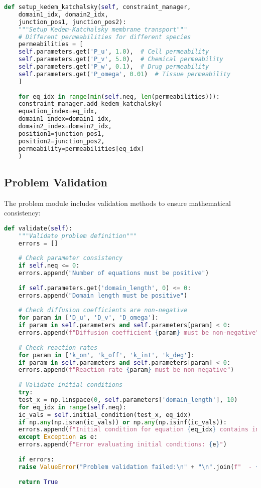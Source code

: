 \begin{lstlisting}[language=Python, caption=Kedem-Katchalsky Conditions]
	def setup_kedem_katchalsky(self, constraint_manager,
	domain1_idx, domain2_idx, 
	junction_pos1, junction_pos2):
	"""Setup Kedem-Katchalsky membrane transport"""
	# Different permeabilities for different species
	permeabilities = [
	self.parameters.get('P_u', 1.0),  # Cell permeability
	self.parameters.get('P_v', 5.0),  # Chemical permeability
	self.parameters.get('P_w', 0.1),  # Drug permeability
	self.parameters.get('P_omega', 0.01)  # Tissue permeability
	]
	
	for eq_idx in range(min(self.neq, len(permeabilities))):
	constraint_manager.add_kedem_katchalsky(
	equation_index=eq_idx,
	domain1_index=domain1_idx,
	domain2_index=domain2_idx,
	position1=junction_pos1,
	position2=junction_pos2,
	permeability=permeabilities[eq_idx]
	)
\end{lstlisting}

\subsection{Problem Validation}
\label{subsec:problem_validation}

The problem module includes validation methods to ensure mathematical consistency:

\begin{lstlisting}[language=Python, caption=Problem Validation]
	def validate(self):
	"""Validate problem definition"""
	errors = []
	
	# Check parameter consistency
	if self.neq <= 0:
	errors.append("Number of equations must be positive")
	
	if self.parameters.get('domain_length', 0) <= 0:
	errors.append("Domain length must be positive")
	
	# Check diffusion coefficients are non-negative
	for param in ['D_u', 'D_v', 'D_omega']:
	if param in self.parameters and self.parameters[param] < 0:
	errors.append(f"Diffusion coefficient {param} must be non-negative")
	
	# Check reaction rates
	for param in ['k_on', 'k_off', 'k_int', 'k_deg']:
	if param in self.parameters and self.parameters[param] < 0:
	errors.append(f"Reaction rate {param} must be non-negative")
	
	# Validate initial conditions
	try:
	test_x = np.linspace(0, self.parameters['domain_length'], 10)
	for eq_idx in range(self.neq):
	ic_vals = self.initial_condition(test_x, eq_idx)
	if np.any(np.isnan(ic_vals)) or np.any(np.isinf(ic_vals)):
	errors.append(f"Initial condition for equation {eq_idx} contains invalid values")
	except Exception as e:
	errors.append(f"Error evaluating initial conditions: {e}")
	
	if errors:
	raise ValueError("Problem validation failed:\n" + "\n".join(f"  - {err}" for err in errors))
	
	return True
\end{lstlisting}

